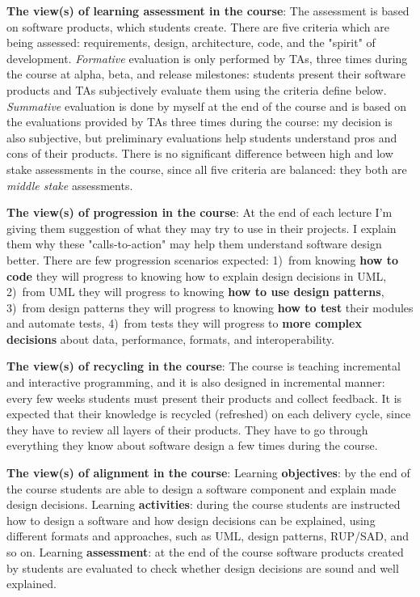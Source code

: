 \documentclass[nobrand,anonymous,nodate,nosecurity]{huawei}
\begin{document}
\newpage
\textbf{The view(s) of learning assessment in the course}:
The assessment is based on software products, which students create. There are
five criteria which are being assessed: requirements, design, architecture, code,
and the "spirit" of development.
\emph{Formative} evaluation is only performed by TAs, three times during the course
at alpha, beta, and release milestones: students present their software products
and TAs subjectively evaluate them using the criteria define below.
\emph{Summative} evaluation is done by myself at the end of the course and is
based on the evaluations provided by TAs three times during the course:
my decision is also subjective, but preliminary evaluations help students
understand pros and cons of their products.
There is no significant difference between high and low stake assessments in the course,
since all five criteria are balanced: they both are \emph{middle stake} assessments.

\newpage
\textbf{The view(s) of progression in the course}:
At the end of each lecture I'm giving them suggestion of what they may
try to use in their projects. I explain them why these "calls-to-action" may
help them understand software design better. There are few progression
scenarios expected: 1)~from knowing \textbf{how to code} they will progress to knowing
how to explain design decisions in UML, 2)~from UML they will progress to
knowing \textbf{how to use design patterns}, 3)~from design patterns they will progress
to knowing \textbf{how to test} their modules and automate tests, 4)~from tests
they will progress to \textbf{more complex decisions} about data, performance,
formats, and interoperability.

\newpage
\textbf{The view(s) of recycling in the course}:
The course is teaching incremental and interactive programming, and it is also
designed in incremental manner: every few weeks students must present
their products and collect feedback. It is expected that their knowledge
is recycled (refreshed) on each delivery cycle, since they have
to review all layers of their products. They have to go through everything
they know about software design a few times during the course.

\newpage
\textbf{The view(s) of alignment in the course}:
Learning \textbf{objectives}: by the end of the course students are able to design a software component and explain made design decisions.
Learning \textbf{activities}: during the course students are instructed how to design a software and how design decisions can be explained, using different formats and approaches, such as UML, design patterns, RUP/SAD, and so on.
Learning \textbf{assessment}: at the end of the course software products created by students are evaluated to check whether design decisions are sound and well explained.
\end{document}
